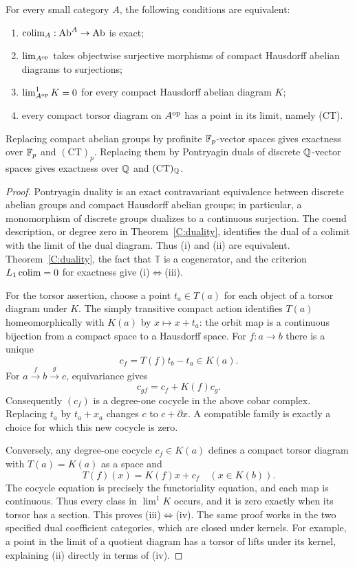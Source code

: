 \begin{theorem}\label{C:torsors}
For every small category $A$, the following conditions are equivalent:
\begin{enumerate}[label=(\roman*)]
\item $\operatorname*{colim}_A:\mathrm{Ab}^A\to\mathrm{Ab}$ is exact;
\item $\lim_{A^{\mathrm{op}}}$ takes objectwise surjective morphisms of compact Hausdorff abelian diagrams to surjections;
\item $\lim^1_{A^{\mathrm{op}}}K=0$ for every compact Hausdorff abelian diagram $K$;
\item every compact torsor diagram on $A^{\mathrm{op}}$ has a point in its limit, namely (CT).
\end{enumerate}
Replacing compact abelian groups by profinite $\mathbb F_p$-vector spaces gives exactness over $\mathbb F_p$ and $(\mathrm{CT})_p$. Replacing them by Pontryagin duals of discrete $\mathbb Q$-vector spaces gives exactness over $\mathbb Q$ and $(\mathrm{CT})_{\mathbb Q}$.
\end{theorem}
\begin{proof}
Pontryagin duality is an exact contravariant equivalence between discrete abelian groups and compact Hausdorff abelian groups; in particular, a monomorphism of discrete groups dualizes to a continuous surjection. The coend description, or degree zero in Theorem~\ref{C:duality}, identifies the dual of a colimit with the limit of the dual diagram. Thus (i) and (ii) are equivalent. Theorem~\ref{C:duality}, the fact that $\mathbb T$ is a cogenerator, and the criterion $L_1\operatorname*{colim}=0$ for exactness give (i)$\Leftrightarrow$(iii).

For the torsor assertion, choose a point $t_a\in T(a)$ for each object of a torsor diagram under $K$. The simply transitive compact action identifies $T(a)$ homeomorphically with $K(a)$ by $x\mapsto x+t_a$: the orbit map is a continuous bijection from a compact space to a Hausdorff space. For $f:a\to b$ there is a unique
\[
 c_f=T(f)t_b-t_a\in K(a).
\]
For $a\xrightarrow f b\xrightarrow g c$, equivariance gives
\[
 c_{gf}=c_f+K(f)c_g.
\]
Consequently $(c_f)$ is a degree-one cocycle in the above cobar complex. Replacing $t_a$ by $t_a+x_a$ changes $c$ to $c+\partial x$. A compatible family is exactly a choice for which this new cocycle is zero.

Conversely, any degree-one cocycle $c_f\in K(a)$ defines a compact torsor diagram with $T(a)=K(a)$ as a space and
\[
 T(f)(x)=K(f)x+c_f\quad(x\in K(b)).
\]
The cocycle equation is precisely the functoriality equation, and each map is continuous. Thus every class in $\lim^1K$ occurs, and it is zero exactly when its torsor has a section. This proves (iii)$\Leftrightarrow$(iv). The same proof works in the two specified dual coefficient categories, which are closed under kernels. For example, a point in the limit of a quotient diagram has a torsor of lifts under its kernel, explaining (ii) directly in terms of (iv).
\end{proof}

